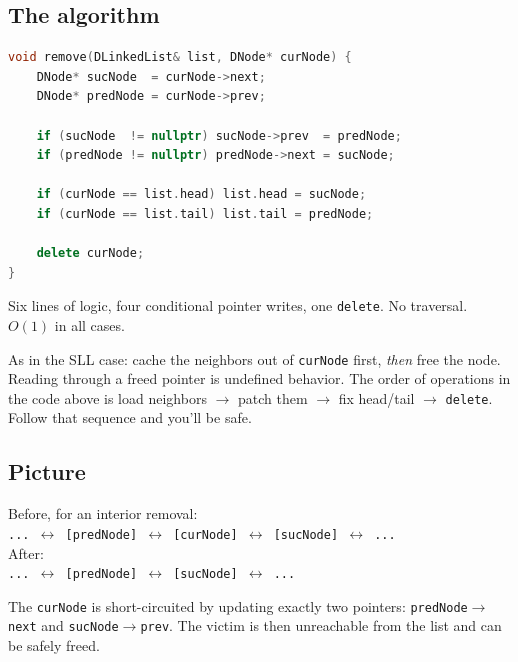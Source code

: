 \documentclass[11pt]{article}
\begin{document}
\subsection{The algorithm}

\begin{examplebox}
\begin{lstlisting}[basicstyle=\ttfamily\small,frame=single,language=C++]
void remove(DLinkedList& list, DNode* curNode) {
    DNode* sucNode  = curNode->next;
    DNode* predNode = curNode->prev;

    if (sucNode  != nullptr) sucNode->prev  = predNode;
    if (predNode != nullptr) predNode->next = sucNode;

    if (curNode == list.head) list.head = sucNode;
    if (curNode == list.tail) list.tail = predNode;

    delete curNode;
}
\end{lstlisting}
Six lines of logic, four conditional pointer writes, one
\texttt{delete}. No traversal. $O(1)$ in all cases.
\end{examplebox}

\begin{warnbox}
As in the SLL case: cache the neighbors out of \texttt{curNode}
first, \emph{then} free the node. Reading through a freed pointer
is undefined behavior. The order of operations in the code above is
load neighbors $\to$ patch them $\to$ fix head/tail $\to$
\texttt{delete}. Follow that sequence and you'll be safe.
\end{warnbox}

\subsection{Picture}

\begin{center}
\footnotesize
Before, for an interior removal:\\
\texttt{... $\leftrightarrow$ [predNode] $\leftrightarrow$ [curNode] $\leftrightarrow$ [sucNode] $\leftrightarrow$ ...}
\\[0.5em]
After:\\
\texttt{... $\leftrightarrow$ [predNode] $\leftrightarrow$ [sucNode] $\leftrightarrow$ ...}
\end{center}

The \texttt{curNode} is short-circuited by updating exactly two
pointers: \texttt{predNode$\to$next} and \texttt{sucNode$\to$prev}.
The victim is then unreachable from the list and can be safely
freed.
\end{document}
